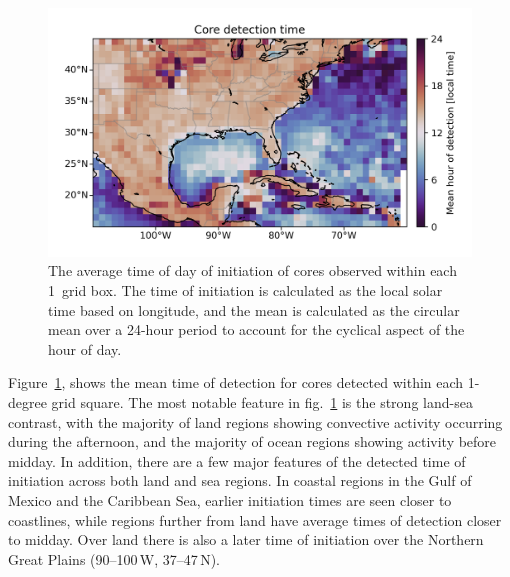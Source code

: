 \begin{figure}[tp]
    \centering
    \includegraphics[width=\textwidth]{figures/chapter2_11.png}
    \caption[
    A map of the average time of day of initiation of detected cores
    ]{
    The average time of day of initiation of cores observed within each 1\textdegree\ grid box. The time of initiation is calculated as the local solar time based on longitude, and the mean is calculated as the circular mean over a 24-hour period to account for the cyclical aspect of the hour of day.
    }
    \label{fig:core_detection_time_map}
\end{figure}

Figure~\ref{fig:core_detection_time_map}, shows the mean time of detection for cores detected within each 1-degree grid square.
The most notable feature in fig.~\ref{fig:core_detection_time_map} is the strong land-sea contrast, with the majority of land regions showing convective activity occurring during the afternoon, and the majority of ocean regions showing activity before midday.
In addition, there are a few major features of the detected time of initiation across both land and sea regions.
In coastal regions in the Gulf of Mexico and the Caribbean Sea, earlier initiation times are seen closer to coastlines, while regions further from land have average times of detection closer to midday.
Over land there is also a later time of initiation over the Northern Great Plains (90--100\,\textdegree W, 37--47\,\textdegree N).



